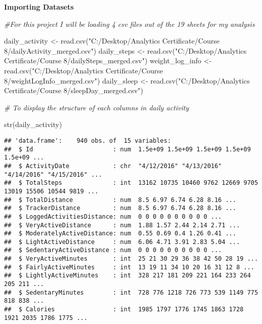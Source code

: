 \documentclass[
]{article}
\newenvironment{Shaded}{\begin{snugshade}}{\end{snugshade}}
\newcommand{\CommentTok}[1]{\textcolor[rgb]{0.56,0.35,0.01}{\textit{#1}}}
\newcommand{\FunctionTok}[1]{\textcolor[rgb]{0.00,0.00,0.00}{#1}}
\newcommand{\NormalTok}[1]{#1}
\newcommand{\OtherTok}[1]{\textcolor[rgb]{0.56,0.35,0.01}{#1}}
\newcommand{\StringTok}[1]{\textcolor[rgb]{0.31,0.60,0.02}{#1}}
\begin{document}
\textbf{Importing Datasets}

\begin{Shaded}
\begin{Highlighting}[]
\CommentTok{\#For this project I will be loading 4 csv files out of the 19 sheets for my analysis}

\NormalTok{daily\_activity }\OtherTok{\textless{}{-}} \FunctionTok{read.csv}\NormalTok{(}\StringTok{"C:/Desktop/Analytics Certificate/Course 8/dailyActivity\_merged.csv"}\NormalTok{)}
\NormalTok{daily\_steps }\OtherTok{\textless{}{-}} \FunctionTok{read.csv}\NormalTok{(}\StringTok{"C:/Desktop/Analytics Certificate/Course 8/dailySteps\_merged.csv"}\NormalTok{)}
\NormalTok{weight\_log\_info }\OtherTok{\textless{}{-}} \FunctionTok{read.csv}\NormalTok{(}\StringTok{"C:/Desktop/Analytics Certificate/Course 8/weightLogInfo\_merged.csv"}\NormalTok{)}
\NormalTok{daily\_sleep }\OtherTok{\textless{}{-}} \FunctionTok{read.csv}\NormalTok{(}\StringTok{"C:/Desktop/Analytics Certificate/Course 8/sleepDay\_merged.csv"}\NormalTok{)}


\CommentTok{\# To display the structure of each columns in daily activity }

\FunctionTok{str}\NormalTok{(daily\_activity)}
\end{Highlighting}
\end{Shaded}

\begin{verbatim}
## 'data.frame':    940 obs. of  15 variables:
##  $ Id                      : num  1.5e+09 1.5e+09 1.5e+09 1.5e+09 1.5e+09 ...
##  $ ActivityDate            : chr  "4/12/2016" "4/13/2016" "4/14/2016" "4/15/2016" ...
##  $ TotalSteps              : int  13162 10735 10460 9762 12669 9705 13019 15506 10544 9819 ...
##  $ TotalDistance           : num  8.5 6.97 6.74 6.28 8.16 ...
##  $ TrackerDistance         : num  8.5 6.97 6.74 6.28 8.16 ...
##  $ LoggedActivitiesDistance: num  0 0 0 0 0 0 0 0 0 0 ...
##  $ VeryActiveDistance      : num  1.88 1.57 2.44 2.14 2.71 ...
##  $ ModeratelyActiveDistance: num  0.55 0.69 0.4 1.26 0.41 ...
##  $ LightActiveDistance     : num  6.06 4.71 3.91 2.83 5.04 ...
##  $ SedentaryActiveDistance : num  0 0 0 0 0 0 0 0 0 0 ...
##  $ VeryActiveMinutes       : int  25 21 30 29 36 38 42 50 28 19 ...
##  $ FairlyActiveMinutes     : int  13 19 11 34 10 20 16 31 12 8 ...
##  $ LightlyActiveMinutes    : int  328 217 181 209 221 164 233 264 205 211 ...
##  $ SedentaryMinutes        : int  728 776 1218 726 773 539 1149 775 818 838 ...
##  $ Calories                : int  1985 1797 1776 1745 1863 1728 1921 2035 1786 1775 ...
\end{verbatim}
\end{document}
